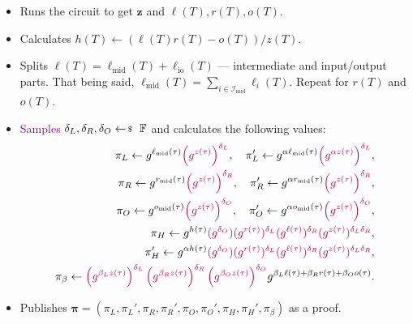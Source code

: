 \documentclass[../../book.tex]{subfiles}
\begin{document}
\begin{tcolorbox}
\begin{itemize}[label=]
        \item Runs the circuit to get $\mathbf{z}$ and $\ell(T),r(T),o(T)$.
        \item Calculates $h(T) \gets (\ell(T)r(T) - o(T))\big/ z(T)$.
        \item Splits $\ell(T) = \ell_{\text{mid}}(T) + \ell_{\text{io}}(T)$ --- intermediate and input/output parts. That being said, $\ell_{\text{mid}}(T) = \sum_{i \in \mathcal{I}_{\text{mid}}}\ell_i(T)$. Repeat for $r(T)$ and $o(T)$.
        \item \textcolor{purple}{Samples $\delta_L, \delta_R, \delta_O \leftarrowS \mathbb{F}$} and calculates the following values: 
        \begin{align*}
            \pi_L \gets g^{\ell_{\text{mid}}(\tau)}\textcolor{purple}{\left(g^{z(\tau)}\right)^{\delta_L}}, \quad \pi_L' \gets g^{\alpha \ell_{\text{mid}}(\tau)}\textcolor{purple}{\left(g^{\alpha z(\tau)}\right)^{\delta_L}}, \\
            \pi_R \gets g^{r_{\text{mid}}(\tau)}\textcolor{purple}{\left(g^{z(\tau)}\right)^{\delta_R}}, \quad \pi_R' \gets g^{\alpha r_{\text{mid}}(\tau)}\textcolor{purple}{\left(g^{z(\tau)}\right)^{\delta_R}}, \\
            \pi_O \gets g^{o_{\text{mid}}(\tau)}\textcolor{purple}{\left(g^{z(\tau)}\right)^{\delta_O}}, \quad \pi_O' \gets g^{\alpha o_{\text{mid}}(\tau)}\textcolor{purple}{\left(g^{z(\tau)}\right)^{\delta_O}}, \\
            \pi_H \gets g^{h(\tau)}\textcolor{purple}{(g^{\delta_O})(g^{r(\tau)})^{\delta_L}(g^{\ell(\tau)})^{\delta_R}(g^{z(\tau)})^{\delta_L\delta_R}}, \\ 
            \pi_H' \gets g^{\alpha h(\tau)}\textcolor{purple}{(g^{\delta_O})(g^{r(\tau)})^{\delta_L}(g^{\ell(\tau)})^{\delta_R}(g^{z(\tau)})^{\delta_L\delta_R}}, \\
            \pi_{\beta} \gets \textcolor{purple}{\left(g^{\beta_L z(\tau)}\right)^{\delta_L}\left(g^{\beta_R z(\tau)}\right)^{\delta_R}\left(g^{\beta_O z(\tau)}\right)^{\delta_O}}g^{\beta_L\ell(\tau) + \beta_Rr(\tau) + \beta_Oo(\tau)}.
        \end{align*}
        \item Publishes $\boldsymbol{\pi} = (\pi_L,\pi_L',\pi_R,\pi_R',\pi_O,\pi_O',\pi_H,\pi_H',\pi_{\beta})$ as a proof.
    \end{itemize}


\end{tcolorbox}
\end{document}
